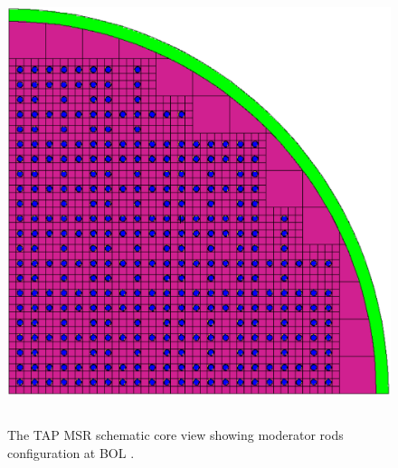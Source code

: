 \begin{frame}
\begin{textblock*}{12.5cm}
\begin{columns}
		\column[t]{5.5cm}
			\hspace{-9mm}
		\begin{figure}      
			\includegraphics[height=1.03\textwidth]{./images/tap_core_ornl.png}
			\caption{The \gls{TAP} \gls{MSR} schematic core view showing 
			moderator rods configuration at \gls{BOL} 
			\cite{betzler_assessment_2017}.}
		\end{figure}
	\end{columns}
	
\end{textblock*}

\end{frame}


